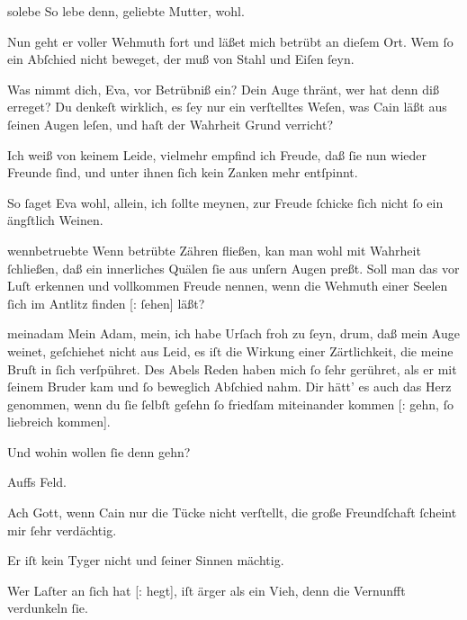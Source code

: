 \documentclass[tocstyle=ref-genre]{ees}
\begin{document}
{\begin{movement}{solebe}
  \voice[Abel]
  So lebe denn, geliebte Mutter, wohl.

  \voice[Eva]
  Nun geht er voller Wehmuth fort
  und läßet mich betrübt an dieſem Ort.
  Wem ſo ein Abſchied nicht beweget,
  der muß von Stahl und Eiſen ſeyn.

  \voice[Adam]
  Was nimmt dich, Eva, vor Betrübniß ein?
  Dein Auge thränt, wer hat denn diß erreget?
  Du denkeſt wirklich,
  es ſey nur ein verſtelltes Weſen,
  was Cain läßt aus ſeinen Augen leſen,
  und haſt der Wahrheit Grund verricht?

  \voice[Eva]
  Ich weiß von keinem Leide,
  vielmehr empfind ich Freude,
  daß ſie nun wieder Freunde ſind,
  und unter ihnen ſich kein Zanken mehr entſpinnt.

  \voice[Adam]
  So ſaget Eva wohl, allein, ich ſollte meynen,
  zur Freude ſchicke ſich nicht ſo ein ängſtlich Weinen.
\end{movement}

\begin{movement}{wennbetruebte}
  \voice[Adam]
  Wenn betrübte Zähren fließen,
  kan man wohl mit Wahrheit ſchließen,
  daß ein innerliches Quälen
  ſie aus unſern Augen preßt.
  Soll man das vor Luſt erkennen
  und vollkommen Freude nennen,
  wenn die Wehmuth einer Seelen
  ſich im Antlitz finden [: ſehen] läßt?
\end{movement}

\begin{movement}{meinadam}
  \voice[Eva]
  Mein Adam, mein,
  ich habe Urſach froh zu ſeyn,
  drum, daß mein Auge weinet,
  geſchiehet nicht aus Leid,
  es iſt die Wirkung einer Zärtlichkeit,
  die meine Bruſt in ſich verſpühret.
  Des Abels Reden haben mich ſo ſehr gerühret,
  als er mit ſeinem Bruder kam
  und ſo beweglich Abſchied nahm.
  Dir hätt’ es auch das Herz genommen,
  wenn du ſie ſelbſt geſehn
  ſo friedſam miteinander kommen [: gehn, ſo liebreich kommen].

  \voice[Adam]
  Und wohin wollen ſie denn gehn?

  \voice[Eva]
  Auffs Feld.

  \voice[Adam]
  Ach Gott, wenn Cain nur die Tücke nicht verſtellt,
  die große Freundſchaft ſcheint mir ſehr verdächtig.

  \voice[Eva]
  Er iſt kein Tyger nicht und ſeiner Sinnen mächtig.

  \voice[Adam]
  Wer Laſter an ſich hat [: hegt], iſt ärger als ein Vieh,
  denn die Vernunfft verdunkeln ſie.


\end{movement}}
\end{document}
